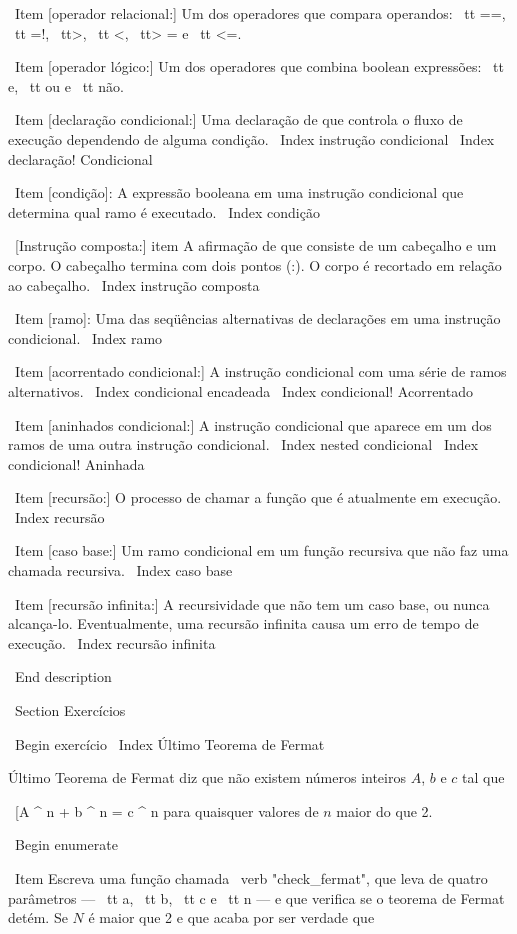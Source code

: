 \documentclass[10pt]{book}
\begin{document}
{{{\ Item [operador relacional:] Um dos operadores que compara
operandos: {\ tt ==}, {\ tt =!}, {\ tt>}, {\ tt <}, {\ tt> =} e {\ tt <=}.

\ Item [operador lógico:] Um dos operadores que combina boolean
expressões: {\ tt e}, {\ tt ou} e {\ tt não}.

\ Item [declaração condicional:] Uma declaração de que controla o fluxo de
execução dependendo de alguma condição.
\ Index {instrução condicional}
\ Index {declaração! Condicional}

\ Item [condição]: A expressão booleana em uma instrução condicional
que determina qual ramo é executado.
\ Index {condição}

\ [Instrução composta:] item A afirmação de que consiste de um cabeçalho
e um corpo. O cabeçalho termina com dois pontos (:). O corpo é recortado
em relação ao cabeçalho.
\ Index {instrução composta}

\ Item [ramo]: Uma das seqüências alternativas de declarações em
uma instrução condicional.
\ Index {ramo}

\ Item [acorrentado condicional:] A instrução condicional com uma série
de ramos alternativos.
\ Index {condicional encadeada}
\ Index {condicional! Acorrentado}

\ Item [aninhados condicional:] A instrução condicional que aparece
em um dos ramos de uma outra instrução condicional.
\ Index {nested condicional}
\ Index {condicional! Aninhada}

\ Item [recursão:] O processo de chamar a função que é
atualmente em execução.
\ Index {recursão}

\ Item [caso base:] Um ramo condicional em um
função recursiva que não faz uma chamada recursiva.
\ Index {caso base}

\ Item [recursão infinita:] A recursividade que não tem um
caso base, ou nunca alcança-lo. Eventualmente, uma recursão infinita
causa um erro de tempo de execução.
\ Index {recursão infinita}

\ End {description}

\ Section {Exercícios}

\ Begin {} exercício
\ Index {Último Teorema de Fermat}

Último Teorema de Fermat diz que não existem números inteiros
$ A $, $ b $ e $ c $ tal que

\ [A ^ n + b ^ n = c ^ n \]
%
para quaisquer valores de $ n $ maior do que 2.

\ Begin {enumerate}

\ Item Escreva uma função chamada \ verb "check_fermat", que leva de quatro
parâmetros --- {\ tt a}, {\ tt b}, {\ tt c} e {\ tt n} --- e
que verifica se o teorema de Fermat detém. Se
$ N $ é maior que 2 e que acaba por ser verdade que 

}}}
\end{document}
